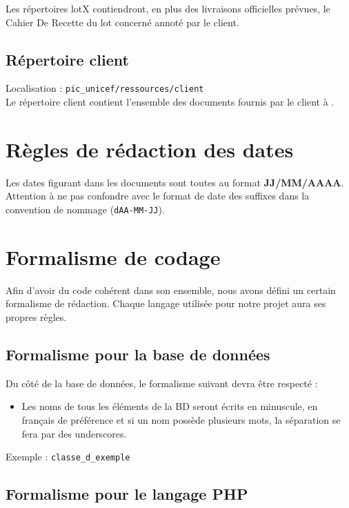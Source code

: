 Les répertoires lotX contiendront, en plus des livraisons officielles prévues, le Cahier De Recette du lot concerné annoté par le client.

\subsection{Répertoire client}

Localisation : \verb+pic_unicef/ressources/client+\\

Le répertoire client contient l’ensemble des documents fournis par le client à \nomEquipe.


\section{Règles de rédaction des dates}

Les dates figurant dans les documents sont toutes au format \textbf{JJ/MM/AAAA}. Attention à ne pas confondre avec le format de date des  suffixes dans la convention de nommage (\verb+dAA-MM-JJ+).


\section{Formalisme de codage}

Afin d'avoir du code cohérent dans son ensemble, nous avons défini un certain formalisme de rédaction. Chaque langage utilisée pour notre projet aura ses propres règles. 

\subsection{Formalisme pour la base de données}

Du côté de la base de données, le formalisme suivant devra être respecté : 
\begin{itemize}
\item Les noms de tous les éléments de la BD seront écrits en minuscule, en français de préférence et si un nom possède plusieurs mots, la séparation se fera par des underscores.\\
\end{itemize}
Exemple : \verb+classe_d_exemple+\\

\subsection{Formalisme pour le langage PHP}

